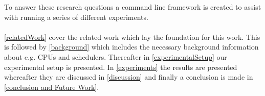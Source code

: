 

To answer these research questions a command line framework is created to assist with running a series of different experiments.

\paragraph{}
\cref{relatedWork} cover the related work which lay the foundation for this work. This is followed by \cref{background} which includes the necessary background information about e.g. CPUs and schedulers. Thereafter in \cref{experimentalSetup} our experimental setup is presented. %
In \cref{experiments} the results are presented whereafter they are discussed in \cref{discussion} and finally a conclusion is made in \cref{conclusion and Future Work}. 


